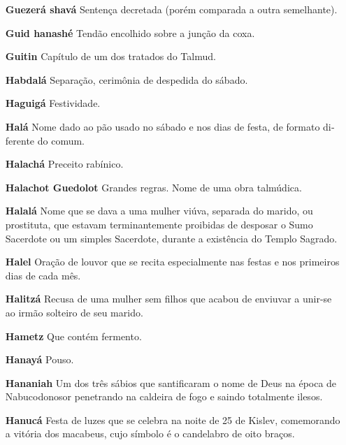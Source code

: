 \begin{itemize}
\item[\textbf{Guezerá shavá}]
Sentença decreta­da (porém comparada a outra seme­lhante).

\item[\textbf{Guid hanashé}] Tendão encolhido so­bre a junção da coxa.

\item[\textbf{Guitin}] Capítulo de um dos tratados do Talmud.

\item[\textbf{Habdalá}] Separação, cerimônia de despedida do sábado.

\item[\textbf{Haguigá}] Festividade.

\item[\textbf{Halá}] Nome dado ao pão usado no sá­bado e nos dias de festa,
de formato di­ferente do comum.

\item[\textbf{Halachá}] Preceito rabínico.

\item[\textbf{Halachot Guedolot}] Grandes regras. Nome de uma obra talmúdica.

\item[\textbf{Halalá}] Nome que
se dava a uma mu­lher viúva, separada do marido, ou prostituta, que
estavam terminante­mente proibidas de desposar o Sumo Sacerdote ou um
simples Sacerdote, durante a existência do Templo Sa­grado.

\item[\textbf{Halel}] Oração de louvor que se reci­ta especialmente nas
festas e nos pri­meiros dias de cada mês.

\item[\textbf{Halitzá}] Recusa de uma mulher sem filhos que acabou de
enviuvar a unir-se ao irmão solteiro de seu marido.

\item[\textbf{Hametz}] Que contém fermento.

\item[\textbf{Hanayá}] Pouso.

\item[\textbf{Hananiah}] Um dos três sábios que santificaram o nome de Deus
na épo­ca de Nabucodonosor penetrando na caldeira de fogo e saindo
totalmente ilesos.

\item[\textbf{Hanucá}] Festa de luzes que se cele­bra na noite de 25 de
Kislev, comemo­rando a vitória dos macabeus, cujo símbolo é o candelabro
de oito braços.


\end{itemize}
